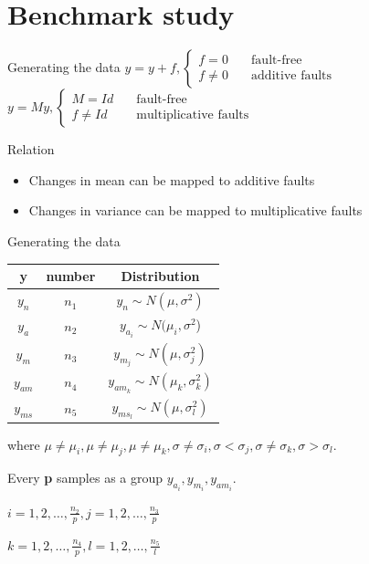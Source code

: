 \documentclass[10pt]{beamer}
\begin{document}
\section{Benchmark study}
\begin{frame}{Generating the data}
    $y = y + f, \left\{ \begin{aligned}
    f = 0      \quad &\text{fault-free} \\
    f \neq 0   \quad &\text{additive faults}
     \end{aligned} 
     \right. $
   $y = My,\left\{ \begin{aligned}
    M = Id     \quad &\text{fault-free} \\
    f \neq Id   \quad &\text{multiplicative faults}
     \end{aligned} 
     \right. $
      \begin{exampleblock}{Relation}
	\begin{itemize}
    \item Changes in mean can be mapped to additive faults
    \item Changes in variance can be mapped to multiplicative faults
    \end{itemize}
    \end{exampleblock}
\end{frame}
\begin{frame}{Generating the data}
\begin{center}
\begin{tabular}{ccc}
\hline
y& number& Distribution                                    \\
\hline
$y_n  $ &$n_1$& $y_n \sim N(\mu, \sigma^2)$                \\
$y_a  $ &$n_2$& $y_{a_i} \sim N(\mu_i,\sigma^2$)           \\
$y_m  $ &$n_3$& $y_{m_j} \sim N(\mu,\sigma_j^2)$           \\
$y_{am}$&$n_4$& $y_{am_k}\sim N(\mu_k,\sigma_k^2)$         \\
$y_{ms}$ &$n_5$& $y_{ms_l} \sim N(\mu,\sigma_l^2)$  \\
\hline
\end{tabular}
\end{center}
where $\mu \neq \mu_i,\mu \neq \mu_j,\mu \neq \mu_k,\sigma \neq \sigma_i,\sigma < \sigma_j,\sigma \neq \sigma_k,\sigma > \sigma_l$. \par Every \textbf{p} samples as a group
$y_{a_i},y_{m_i},y_{am_i}$. \par $i = 1,2,\dots,\frac{n_2}{p},j=1,2,\dots,\frac{n_3}{p}$ \par
$k = 1,2,\dots,\frac{n_4}{p},l = 1,2,\dots, \frac{n_5}{l}$
\end{frame}
\end{document}

